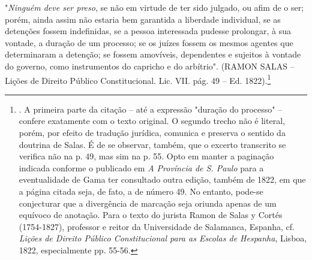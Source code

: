 "\emph{Ninguém deve ser preso}, se não em virtude de ter sido julgado,
ou afim de o ser; porém, ainda assim não estaria bem garantida a
liberdade individual, se as detenções fossem indefinidas, se a pessoa
interessada pudesse prolongar, à sua vontade, a duração de um processo;
se os juízes fossem os mesmos agentes que determinaram a detenção; se
fossem amovíveis, dependentes e sujeitos à vontade do governo, como
instrumentos do capricho e do arbítrio". (RAMON SALAS -- Lições de
Direito Público Constitucional. Lic. VII. pág. 49 -- Ed.
1822).\footnote{. A primeira parte da citação -- até a expressão
  "duração do processo" -- confere exatamente com o texto original. O
  segundo trecho não é literal, porém, por efeito de tradução jurídica,
  comunica e preserva o sentido da doutrina de Salas. É de se observar,
  também, que o excerto transcrito se verifica não na p. 49, mas sim na
  p. 55. Opto em manter a paginação indicada conforme o publicado em
  \emph{A Província de S. Paulo} para a eventualidade de Gama ter
  consultado outra edição, também de 1822, em que a página citada seja,
  de fato, a de número 49. No entanto, pode-se conjecturar que a
  divergência de marcação seja oriunda apenas de um equívoco de
  anotação. Para o texto do jurista Ramon de Salas y Cortés (1754-1827),
  professor e reitor da Universidade de Salamanca, Espanha, cf.
  \emph{Lições de Direito Público Constitucional para as Escolas de
  Hespanha}, Lisboa, 1822, especialmente pp. 55-56.}

